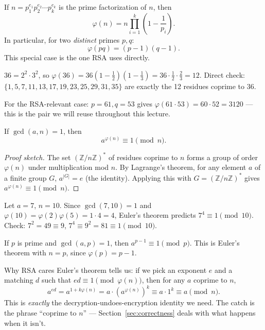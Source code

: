 \begin{proposition}\label{prop:totient}
If $n = p_1^{e_1} p_2^{e_2} \cdots p_k^{e_k}$ is the prime factorization of $n$, then
\[
\varphi(n) = n \prod_{i=1}^{k}\left(1 - \frac{1}{p_i}\right).
\]
In particular, for two \emph{distinct} primes $p, q$:
\[
\varphi(pq) = (p-1)(q-1).
\]
This special case is the one RSA uses directly.
\end{proposition}

\begin{example}
$36 = 2^2 \cdot 3^2$, so $\varphi(36) = 36\left(1 - \frac12\right)\left(1 - \frac13\right) = 36 \cdot \frac12 \cdot \frac23 = 12$. Direct check: $\{1,5,7,11,13,17,19,23,25,29,31,35\}$ are exactly the 12 residues coprime to 36.

For the RSA-relevant case: $p=61, q=53$ gives $\varphi(61 \cdot 53) = 60 \cdot 52 = 3120$ — this is the pair we will reuse throughout this lecture.
\end{example}

\begin{theorem}\label{thm:euler}
If $\gcd(a, n) = 1$, then
\[
a^{\varphi(n)} \equiv 1 \pmod{n}.
\]
\end{theorem}

\begin{proof}[Proof sketch]
The set $(\mathbb{Z}/n\mathbb{Z})^{*}$ of residues coprime to $n$ forms a group of order $\varphi(n)$ under multiplication mod $n$. By Lagrange's theorem, for any element $a$ of a finite group $G$, $a^{|G|} = e$ (the identity). Applying this with $G = (\mathbb{Z}/n\mathbb{Z})^{*}$ gives $a^{\varphi(n)} \equiv 1 \pmod n$.
\end{proof}

\begin{example}
Let $a = 7$, $n = 10$. Since $\gcd(7,10)=1$ and $\varphi(10) = \varphi(2)\varphi(5) = 1 \cdot 4 = 4$, Euler's theorem predicts $7^4 \equiv 1 \pmod{10}$. Check: $7^2 = 49 \equiv 9$, $7^4 \equiv 9^2 = 81 \equiv 1 \pmod{10}$. \checkmark
\end{example}

\begin{corollary}
If $p$ is prime and $\gcd(a,p) = 1$, then $a^{p-1} \equiv 1 \pmod p$. This is Euler's theorem with $n = p$, since $\varphi(p) = p - 1$.
\end{corollary}

\begin{keybox}{Why RSA cares}
Euler's theorem tells us: if we pick an exponent $e$ and a matching $d$ such that $ed \equiv 1 \pmod{\varphi(n)}$, then for any $a$ coprime to $n$,
\[
a^{ed} = a^{1 + k\varphi(n)} = a \cdot (a^{\varphi(n)})^{k} \equiv a \cdot 1^{k} \equiv a \pmod n.
\]
This is \emph{exactly} the decryption-undoes-encryption identity we need. The catch is the phrase ``coprime to $n$'' — Section~\ref{sec:correctness} deals with what happens when it isn't.
\end{keybox}

